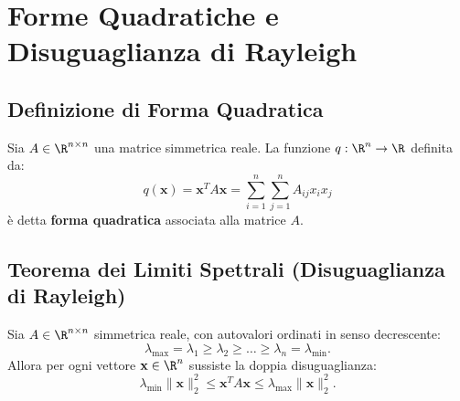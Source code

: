 \FloatBarrier
\section{Forme Quadratiche e Disuguaglianza di Rayleigh}
\label{sec:forme-quadratiche-rayleigh}

\subsection{Definizione di Forma Quadratica}

\begin{definition}
Sia $A \in \R^{n \times n}$ una matrice simmetrica reale. La funzione $q: \R^n \to \R$ definita da:
\begin{equation}
    q(\mathbf{x}) = \mathbf{x}^T A \mathbf{x} = \sum_{i=1}^n \sum_{j=1}^n A_{ij} x_i x_j
\end{equation}
\`e detta \textbf{forma quadratica} associata alla matrice $A$.
\end{definition}

\subsection{Teorema dei Limiti Spettrali (Disuguaglianza di Rayleigh)}

\begin{theorem}
\label{thm:limiti-spettrali}
Sia $A \in \R^{n \times n}$ simmetrica reale, con autovalori ordinati in senso decrescente:
\begin{equation}
    \lambda_{\max} = \lambda_1 \ge \lambda_2 \ge \dots \ge \lambda_n = \lambda_{\min}.
\end{equation}
Allora per ogni vettore $\mathbf{x} \in \R^n$ sussiste la doppia disuguaglianza:
\begin{equation}
    \lambda_{\min} \|\mathbf{x}\|_2^2 \le \mathbf{x}^T A \mathbf{x} \le \lambda_{\max} \|\mathbf{x}\|_2^2.
\end{equation}
\end{theorem}

